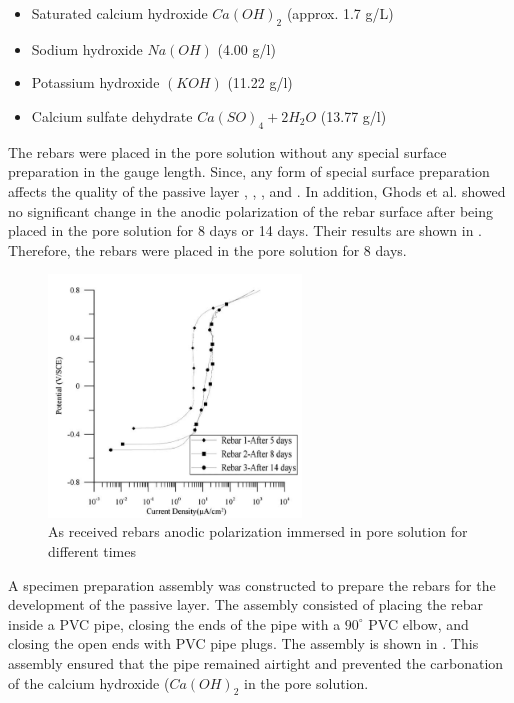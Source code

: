 \begin{itemize}
	\item Saturated calcium hydroxide $Ca(OH)_2$ (approx. 1.7 g/L)
	\item Sodium hydroxide $Na(OH)$ (4.00 g/l)
	\item Potassium hydroxide $(KOH)$ (11.22 g/l)
	\item Calcium sulfate dehydrate $Ca(SO)_4 + 2H_2O$ (13.77 g/l)
\end{itemize}

The rebars were placed in the pore solution without any special surface preparation in the gauge length. Since, any form of special surface preparation affects the quality of the passive layer \cite{Andersson1989}, \cite{DawnMarcotte2001}, \cite{Moragues1987}, and \cite{Page1983}. In addition, Ghods et al. showed no significant change in the anodic polarization of the rebar surface after being placed in the pore solution for 8 days or 14 days. Their results are shown in . Therefore, the rebars were placed in the pore solution for 8 days. 

\begin{figure}[htbp]
	\centering
	\includegraphics[width=0.6\textwidth]{Chapter-3/figs/AsReceived_AnodicPolarization_time}
	\caption{As received rebars anodic polarization immersed in pore solution for different times\cite{Ghods2009}}
	\label{fig:GhodsRebarPassivation}
\end{figure}

A specimen preparation assembly was constructed to prepare the rebars for the development of the passive layer. The assembly consisted of placing the rebar inside a PVC pipe, closing the ends of the pipe with a $90^{\circ}$ PVC elbow, and closing the open ends with PVC pipe plugs. The assembly is shown in . This assembly ensured that the pipe remained airtight and prevented the carbonation of the calcium hydroxide ($Ca(OH)_{2}$ in the pore solution.

